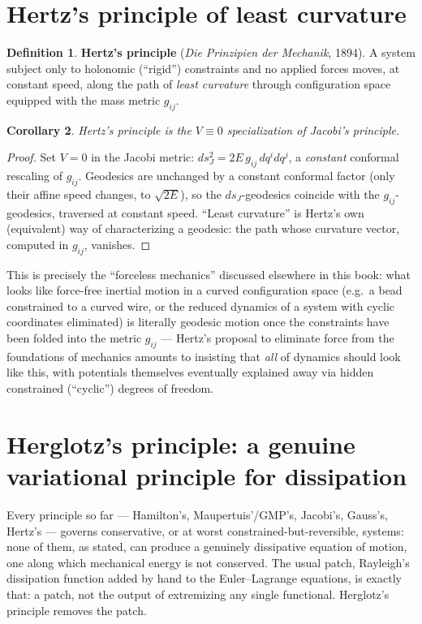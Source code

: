 \documentclass[11pt]{book}
\theoremstyle{definition}
\newtheorem{definition}{Definition}[section]
\theoremstyle{plain}
\newtheorem{corollary}[definition]{Corollary}
\theoremstyle{remark}
\begin{document}
\section{Hertz's principle of least curvature}
\label{sec:hertz}

\begin{definition}
\textbf{Hertz's principle} (\emph{Die Prinzipien der Mechanik}, 1894). A system subject only to holonomic (``rigid'') constraints and no applied forces moves, at constant speed, along the path of \emph{least curvature} through configuration space equipped with the mass metric $g_{ij}$.
\end{definition}

\begin{corollary}
Hertz's principle is the $V\equiv 0$ specialization of Jacobi's principle.
\end{corollary}
\begin{proof}
Set $V=0$ in the Jacobi metric: $ds_J^2 = 2E\,g_{ij}\,dq^idq^j$, a \emph{constant} conformal rescaling of $g_{ij}$. Geodesics are unchanged by a constant conformal factor (only their affine speed changes, to $\sqrt{2E}$), so the $ds_J$-geodesics coincide with the $g_{ij}$-geodesics, traversed at constant speed. ``Least curvature'' is Hertz's own (equivalent) way of characterizing a geodesic: the path whose curvature vector, computed in $g_{ij}$, vanishes.
\end{proof}

This is precisely the ``forceless mechanics'' discussed elsewhere in this book: what looks like force-free inertial motion in a curved configuration space (e.g.\ a bead constrained to a curved wire, or the reduced dynamics of a system with cyclic coordinates eliminated) is literally geodesic motion once the constraints have been folded into the metric $g_{ij}$ --- Hertz's proposal to eliminate force from the foundations of mechanics amounts to insisting that \emph{all} of dynamics should look like this, with potentials themselves eventually explained away via hidden constrained (``cyclic'') degrees of freedom.

\section{Herglotz's principle: a genuine variational principle for dissipation}
\label{sec:herglotz}

Every principle so far --- Hamilton's, Maupertuis'/GMP's, Jacobi's, Gauss's, Hertz's --- governs conservative, or at worst constrained-but-reversible, systems: none of them, as stated, can produce a genuinely dissipative equation of motion, one along which mechanical energy is not conserved. The usual patch, Rayleigh's dissipation function added by hand to the Euler--Lagrange equations, is exactly that: a patch, not the output of extremizing any single functional. Herglotz's principle removes the patch.
\end{document}
